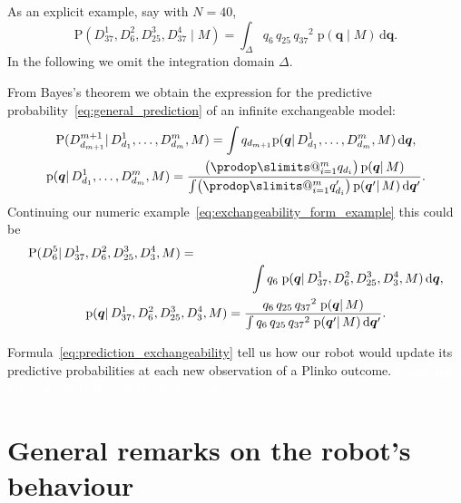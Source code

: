 \documentclass[\ifafour a4paper,12pt,\else a5paper,10pt,\fi%
onecolumn,oneside,article,%
british%
]{memoir}
\makeatletter
\theoremstyle{remark}
\theoremstyle{innote}
\def\prod{\DOTSI\prodop\slimits@}
\newcommand*{\di}{\mathrm{d}}%
\newcommand*{\pf}{\mathrm{p}}%
\newcommand*{\p}{\mathrm{P}}%
\renewcommand*{\|}{\mathpunct{|}}
\newcommand*{\simpl}{\varDelta}
\newcommand*{\yqq}{q}
\newcommand*{\yq}{\bm{\yqq}}
\makeatother
\begin{document}
As an explicit example, say with $N=40$,
\begin{equation}
  \label{eq:exchangeability_form_example}
  \p(D^1_{37} , D^2_{6} , D^3_{25}, D^4_{37} \| M) =
  \int_\simpl \yqq_{6}\, \yqq_{25} \, {\yqq_{37}}^2\;  \pf(\yq \| M)\,\di\yq.
\end{equation}
In the following we omit the integration domain $\simpl$.

From Bayes's theorem we obtain the expression for the predictive
probability~\eqref{eq:general_prediction} of an infinite exchangeable model:
\begin{subequations}\label{eq:prediction_exchangeability}
  \begin{gather}
    \p(D^{m+1}_{d_{m+1}}\| D^1_{d_1}, \dotsc , D^m_{d_m} , M)
    = \int \yqq_{d_{m+1}} \pf(\yq \| D^1_{d_1}, \dotsc, D^m_{d_m}, M)\,\di\yq,
    \\
    \pf(\yq \| D^1_{d_1}, \dotsc, D^m_{d_m}, M)
    = \frac{ \bigl( \prod_{i=1}^m \yqq_{d_i} \bigr)\, \pf(\yq \| M)
      }{
      \int  \bigl( \prod_{i=1}^m \yqq_{d_i}' \bigr)\, \pf(\yq' \| M)\,\di\yq'
      }.
\label{eq:exchang_updated_prior}
  \end{gather}
\end{subequations}
Continuing our numeric example~\eqref{eq:exchangeability_form_example} this
could be
\begin{subequations}\label{eq:prediction_exchangeability_example}
  \begin{gather}
    \begin{multlined}[][0.95\linewidth]
    \p(D^5_{6} \| D^1_{37} , D^2_{6} , D^3_{25}, D^4_{3}, M)
    ={}\\ \int \yqq_{6}\; \pf(\yq \|  D^1_{37} , D^2_{6} , D^3_{25}, D^4_{3}, M)\,\di\yq,
  \end{multlined}
    \\
    \pf(\yq \|  D^1_{37} , D^2_{6} , D^3_{25}, D^4_{3}, M)
    = \frac{ \yqq_{6}\, \yqq_{25} \, {\yqq_{37}}^2\; \pf(\yq \| M)
      }{
      \int \yqq_{6}\, \yqq_{25} \, {\yqq_{37}}^2\; \pf(\yq' \| M)\,\di\yq'
      }.
  \end{gather}
\end{subequations}


Formula~\eqref{eq:prediction_exchangeability} tell us how our robot would
update its predictive probabilities at each new observation of a Plinko outcome.
\textcolor{white}{If you find this you can claim a postcard from me.}
%


\section{General remarks on the robot's behaviour}
\label{sec:remarks}
\end{document}
